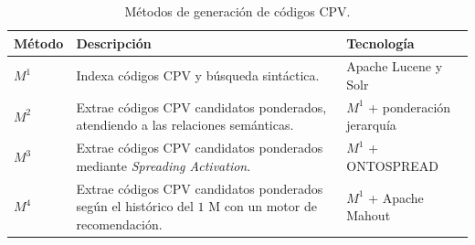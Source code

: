 \documentclass[a4paper,final,11pt,fleqn,twoside]{book}  %
\begin{document}
\begin{table}[!t]
  \centering
\caption{Métodos de generación de códigos CPV.}\label{table:metodos-ir}   
\begin{tabular}[!t]{|l|p{6cm}|p{4cm}|} 
\hline  
\textbf{Método} &  \textbf{Descripción} &  \textbf{Tecnología} \\\hline
$M^1$ & Indexa códigos CPV y búsqueda sintáctica. & Apache Lucene y Solr \\ \hline
$M^2$ & Extrae códigos CPV candidatos ponderados, atendiendo a las relaciones semánticas. & $M^1$ + ponderación jerarquía \\ \hline
$M^3$ & Extrae códigos CPV candidatos ponderados mediante \textit{Spreading Activation}. & $M^1$ + ONTOSPREAD \\ \hline
$M^4$ & Extrae códigos CPV candidatos ponderados según el histórico del $1$ M con un motor de recomendación. & $M^1$ + Apache Mahout \\ \hline
\hline
 \end{tabular}
   \end{table} 
\end{document}
